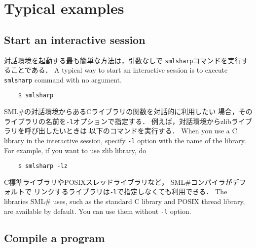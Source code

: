 \documentclass{jbook}
\newcommand{\txt}[2]{#2}
\newcommand{\smlsharp}{SML\#}
\begin{document}
\section{\txt{典型的な使用例}{Typical examples}}

\subsection{\txt{対話環境}{Start an interactive session}}

\ifjp%
	対話環境を起動する最も簡単な方法は，引数なしで
{\tt smlsharp}コマンドを実行することである．
\else%
        A typical way to start an interactive session is to execute
{\tt smlsharp} command with no argument.
\fi%
\begin{verbatim}
    $ smlsharp
\end{verbatim}
\ifjp%
	\smlsharp{}の対話環境からあるCライブラリの関数を対話的に利用したい
場合，そのライブラリの名前を{\tt -l}オプションで指定する．
	例えば，対話環境からzlibライブラリを呼び出したいときは
以下のコマンドを実行する．
\else%
	When you use a C library in the interactive session,
specify {\tt -l} option with the name of the library.
	For example, if you want to use zlib library, do
\fi%
\begin{verbatim}
    $ smlsharp -lz
\end{verbatim}
\ifjp%
	C標準ライブラリやPOSIXスレッドライブラリなど，
\smlsharp{}コンパイラがデフォルトで
リンクするライブラリは{\tt -l}で指定しなくても利用できる．
\else%
        The libraries \smlsharp{} uses, such as the standard
C library and POSIX thread library, are available by default.
	You can use them without {\tt -l} option.
\fi%

\subsection{\txt{プログラムのコンパイル}{Compile a program}}
\end{document}
